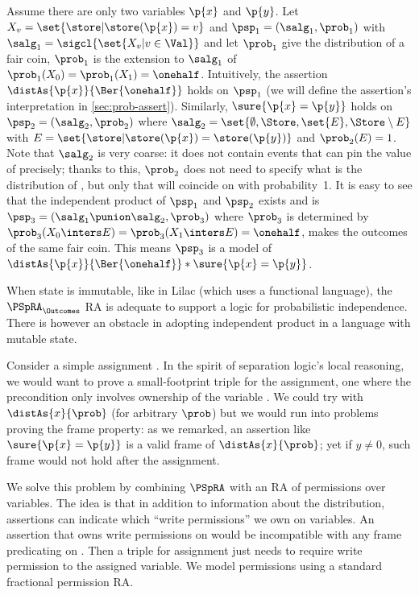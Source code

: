 \begin{example}
\label{ex:indip-prod}
  Assume there are only two variables $\p{x}$ and $\p{y}$.
  Let $X_v = \set{ \store | \store(\p{x}) = v}$
  and  $\psp_1 = (\salg_1,\prob_1) $ with
  $ \salg_1 = \sigcl{\set{ X_v | v \in \Val}} $
  and let $ \prob_1 $ give  the distribution of a fair coin,
  \ie $ \prob_1 $ is
  the extension to $\salg_1$ of
  $ \prob_1(X_0) = \prob_1(X_1) = \onehalf $.
  Intuitively, the assertion $\distAs{\p{x}}{\Ber{\onehalf}}$ holds
  on $\psp_1$
  (we will define the assertion's interpretation in \cref{sec:prob-assert}).
  Similarly, $\sure{\p{x}=\p{y}}$ holds on $\psp_2 = (\salg_2, \prob_2)$
  where
  $
    \salg_2 = \set{\emptyset, \Store, \set{E}, \Store\setminus E}
  $ with $ E = \set{\store | \store(\p{x})=\store(\p{y})} $
  and $\prob_2(E) = 1$.
  Note that $\salg_2$ is very coarse:
  it does not contain events that can pin the value of  precisely;
  thanks to this, $\prob_2$ does not need to specify what is the distribution of , but only that  will coincide on  with probability~1.
  It is easy to see that the independent product of $\psp_1$ and $\psp_2$
  exists and is $\psp_3 = (\salg_1 \punion \salg_2, \prob_3)$
  where $\prob_3$ is determined by
  $ \prob_3(X_0 \inters E) = \prob_3(X_1 \inters E) = \onehalf $,
  \ie makes   the outcomes of the same fair coin.
  This means $\psp_3$ is a model of $\distAs{\p{x}}{\Ber{\onehalf}} * \sure{\p{x}=\p{y}}$.
\end{example}


When state is immutable, like in Lilac (which uses a functional language),
the $\PSpRA_\Outcomes$ RA is adequate to support a logic for probabilistic independence.
There is however an obstacle in adopting independent product in a language
with mutable state.

\begin{example}
  Consider a simple assignment .
  In the spirit of separation logic's local reasoning,
  we would want to prove a
  small-footprint triple for the assignment, \ie one where the precondition
  only involves ownership of the variable .
  We could try with $ \distAs{x}{\prob} $ (for arbitrary $\prob$)
  but we would run into problems proving the frame property:
  as we remarked, an assertion like $\sure{\p{x}=\p{y}}$ is
  a valid frame of $ \distAs{x}{\prob} $;
  yet if $y \ne 0$, such frame would not hold after the assignment.
\end{example}

We solve this problem by combining $\PSpRA$ with an RA of permissions over variables.
The idea is that in addition to information about the distribution,
assertions can indicate which ``write permissions'' we own on variables.
An assertion that owns write permissions on  would be incompatible
with any frame predicating on .
Then a triple for assignment just needs to require write permission
to the assigned variable.
We model permissions using a standard fractional permission RA.

